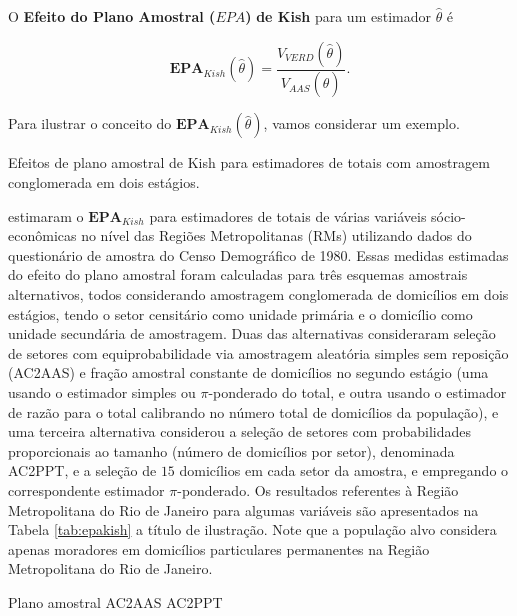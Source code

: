 \documentclass[]{book}
\theoremstyle{definition}
\theoremstyle{definition}
\theoremstyle{definition}
\theoremstyle{remark}
\let\BeginKnitrBlock\begin \let\EndKnitrBlock\end
\begin{document}
\BeginKnitrBlock{definition}
\protect\hypertarget{def:unnamed-chunk-1}{}{\label{def:unnamed-chunk-1} }O
\textbf{Efeito do Plano Amostral (\(EPA\))} \textbf{de Kish} para um
estimador \(\hat{\theta}\) é
\EndKnitrBlock{definition}

\begin{equation}
\mathbf{EPA}_{Kish}\left( \hat{\theta}\right) =\frac{V_{VERD}\left( \hat{\theta}\right) }{V_{AAS}\left( \hat{\theta}\right) }. \label{eq:epa1} \end{equation}

Para ilustrar o conceito do
\(\mathbf{EPA}_{Kish}\left( \hat{\theta}\right)\), vamos considerar um
exemplo.

\BeginKnitrBlock{example}
\protect\hypertarget{exm:epakish}{}{\label{exm:epakish} }Efeitos de plano
amostral de Kish para estimadores de totais com amostragem conglomerada
em dois estágios.
\EndKnitrBlock{example}

\citep{SilvaMou} estimaram o \(\mathbf{EPA}_{Kish}\) para estimadores de
totais de várias variáveis sócio-econômicas no nível das Regiões
Metropolitanas (RMs) utilizando dados do questionário de amostra do
Censo Demográfico de 1980. Essas medidas estimadas do efeito do plano
amostral foram calculadas para três esquemas amostrais alternativos,
todos considerando amostragem conglomerada de domicílios em dois
estágios, tendo o setor censitário como unidade primária e o domicílio
como unidade secundária de amostragem. Duas das alternativas
consideraram seleção de setores com equiprobabilidade via amostragem
aleatória simples sem reposição (AC2AAS) e fração amostral constante de
domicílios no segundo estágio (uma usando o estimador simples ou
\(\pi\)-ponderado do total, e outra usando o estimador de razão para o
total calibrando no número total de domicílios da população), e uma
terceira alternativa considerou a seleção de setores com probabilidades
proporcionais ao tamanho (número de domicílios por setor), denominada
AC2PPT, e a seleção de \(15\) domicílios em cada setor da amostra, e
empregando o correspondente estimador \(\pi\)-ponderado. Os resultados
referentes à Região Metropolitana do Rio de Janeiro para algumas
variáveis são apresentados na Tabela \ref{tab:epakish} a título de
ilustração. Note que a população alvo considera apenas moradores em
domicílios particulares permanentes na Região Metropolitana do Rio de
Janeiro.

Plano amostral AC2AAS AC2PPT
\end{document}
